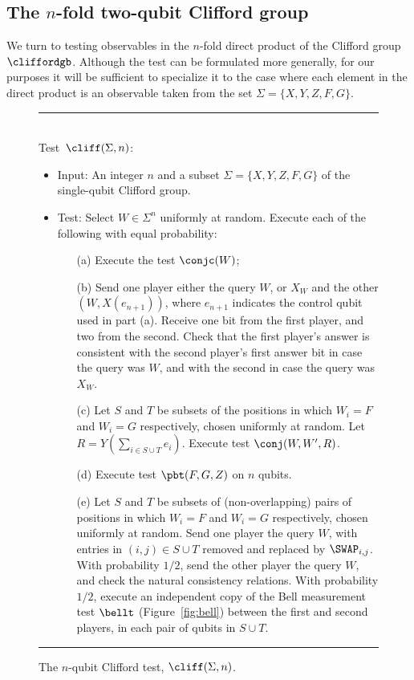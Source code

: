 \subsection{The $n$-fold two-qubit Clifford group}
\label{sec:n-2-clifford}

We turn to testing observables in the $n$-fold direct product of the Clifford group $\cliffordgb$. Although the test can be formulated more generally, for our purposes it will be sufficient to specialize it to the case where each element in the direct product is an observable taken from the set  $\Sigma = \{X,Y,Z,F,G\}$.

\begin{figure}[H]
\rule[1ex]{16.5cm}{0.5pt}\\
Test~$\cliff(\Sigma,n)$:
\begin{itemize}
    \item Input: An integer $n$ and a subset $\Sigma = \{X,Y,Z,F,G\}$ of the single-qubit Clifford group. 
    \item Test: Select $W \in \Sigma^n$ uniformly at random. Execute each of the following with equal probability:
\begin{enumerate}
\item[(a)] Execute the test $\conjc(W)$;
\item[(b)] Send one player either the query $W$, or $X_W$ and the other $(W,X(e_{n+1}))$, where $e_{n+1}$ indicates the control qubit used in part (a). Receive one bit from the first player, and two from the second. Check that the first player's answer is consistent with the second player's first answer bit in case the query was $W$, and with the second in case the query was $X_W$. 
\item[(c)] Let $S$ and $T$ be subsets of the positions in which $W_i=F$ and $W_i=G$ respectively, chosen uniformly at random. Let $R = Y(\sum_{i\in S\cup T} e_i)$. Execute test $\conj(W,W', R)$.
\item[(d)] Execute test $\pbt(F,G,Z)$ on $n$ qubits. 
\item[(e)] Let $S$ and $T$ be subsets of (non-overlapping) pairs of positions in which $W_i=F$ and $W_i=G$ respectively, chosen uniformly at random. Send one player the query $W$, with entries in $(i,j) \in S\cup T$ removed and replaced by $\SWAP_{i,j}$. With probability $1/2$, send the other player the query $W$, and check the natural consistency relations. With probability $1/2$, execute an independent copy of the Bell measurement test $\bellt$ (Figure~\ref{fig:bell}) between the first and second players, in each pair of qubits in $S\cup T$.  
\end{enumerate}
\end{itemize}
\rule[2ex]{16.5cm}{0.5pt}
\caption{The $n$-qubit Clifford test, $\cliff(\Sigma,n)$.}
\label{fig:clifford-test-3}
\end{figure}

